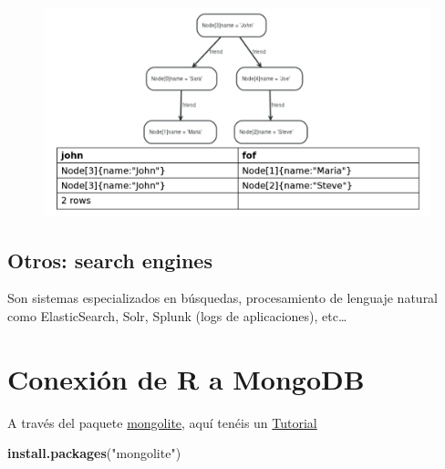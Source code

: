 \documentclass[]{book}
\newenvironment{Shaded}{\begin{snugshade}}{\end{snugshade}}
\newcommand{\KeywordTok}[1]{\textcolor[rgb]{0.13,0.29,0.53}{\textbf{#1}}}
\newcommand{\DataTypeTok}[1]{\textcolor[rgb]{0.13,0.29,0.53}{#1}}
\newcommand{\StringTok}[1]{\textcolor[rgb]{0.31,0.60,0.02}{#1}}
\newcommand{\CommentTok}[1]{\textcolor[rgb]{0.56,0.35,0.01}{\textit{#1}}}
\newcommand{\OperatorTok}[1]{\textcolor[rgb]{0.81,0.36,0.00}{\textbf{#1}}}
\newcommand{\NormalTok}[1]{#1}
\begin{document}
\begin{figure}
\centering
\includegraphics{images/CypherResult.png}
\caption{}
\end{figure}

\subsection{Otros: search engines}\label{otros-search-engines}

Son sistemas especializados en búsquedas, procesamiento de lenguaje
natural como ElasticSearch, Solr, Splunk (logs de aplicaciones),
etc\ldots{}

\section{Conexión de R a MongoDB}\label{conexion-de-r-a-mongodb}

A través del paquete
\href{https://cran.rstudio.com/web/packages/mongolite/mongolite.pdf}{mongolite},
aquí tenéis un
\href{https://datascienceplus.com/using-mongodb-with-r/}{Tutorial}

\begin{Shaded}
\begin{Highlighting}[]
\KeywordTok{install.packages}\NormalTok{(}\StringTok{"mongolite"}\NormalTok{)}
\end{Highlighting}
\end{Shaded}

\begin{Shaded}
\end{Shaded}
\end{document}
